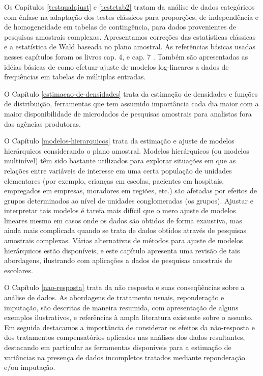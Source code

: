 \documentclass[]{book}
\theoremstyle{definition}
\theoremstyle{definition}
\theoremstyle{remark}
\begin{document}
Os Capítulos \ref{testqualajust} e \ref{testetab2} tratam da análise de
dados categóricos com ênfase na adaptação dos testes clássicos para
proporções, de independência e de homogeneidade em tabelas de
contingência, para dados provenientes de pesquisas amostrais complexas.
Apresentamos correções das estatísticas clássicas e a estatística de
Wald baseada no plano amostral. As referências básicas usadas nesses
capítulos foram os livros cap. 4, \citep{SHS89} e cap. 7
\citep{lethonen}. Também são apresentadas as idéias básicas de como
efetuar ajuste de modelos log-lineares a dados de frequências em tabelas
de múltiplas entradas.

O Capítulo \ref{estimacao-de-densidades} trata da estimação de
densidades e funções de distribuição, ferramentas que tem assumido
importância cada dia maior com a maior disponibilidade de microdados de
pesquisas amostrais para analistas fora das agências produtoras.

O Capítulo \ref{modelos-hierarquicos} trata da estimação e ajuste de
modelos hierárquicos considerando o plano amostral. Modelos hierárquicos
(ou modelos multinível) têm sido bastante utilizados para explorar
situações em que as relações entre variáveis de interesse em uma certa
população de unidades elementares (por exemplo, crianças em escolas,
pacientes em hospitais, empregados em empresas, moradores em regiões,
etc.) são afetadas por efeitos de grupos determinados ao nível de
unidades conglomeradas (os grupos). Ajustar e interpretar tais modelos é
tarefa mais difícil que o mero ajuste de modelos lineares mesmo em casos
onde os dados são obtidos de forma exaustiva, mas ainda mais complicada
quando se trata de dados obtidos através de pesquisas amostrais
complexas. Várias alternativas de métodos para ajuste de modelos
hierárquicos estão disponíveis, e este capítulo apresenta uma revisão de
tais abordagens, ilustrando com aplicações a dados de pesquisas
amostrais de escolares.

O Capítulo \ref{nao-resposta} trata da não resposta e suas conseqüências
sobre a análise de dados. As abordagens de tratamento usuais,
reponderação e imputação, são descritas de maneira resumida, com
apresentação de alguns exemplos ilustrativos, e referências à ampla
literatura existente sobre o assunto. Em seguida destacamos a
importância de considerar os efeitos da não-resposta e dos tratamentos
compensatórios aplicados nas análises dos dados resultantes, destacando
em particular as ferramentas disponíveis para a estimação de variâncias
na presença de dados incompletos tratados mediante reponderação e/ou
imputação.
\end{document}
